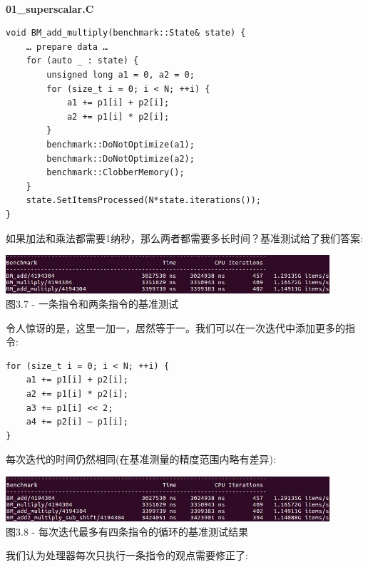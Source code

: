\hspace*{\fill} \\ %
\noindent
\textbf{01\_superscalar.C}
\begin{lstlisting}[style=styleCXX]
void BM_add_multiply(benchmark::State& state) {
	… prepare data …
	for (auto _ : state) {
		unsigned long a1 = 0, a2 = 0;
		for (size_t i = 0; i < N; ++i) {
			a1 += p1[i] + p2[i];
			a2 += p1[i] * p2[i];
		}
		benchmark::DoNotOptimize(a1);
		benchmark::DoNotOptimize(a2);
		benchmark::ClobberMemory();
	}
	state.SetItemsProcessed(N*state.iterations());
}
\end{lstlisting}

如果加法和乘法都需要1纳秒，那么两者都需要多长时间？基准测试给了我们答案:

\begin{center}
\includegraphics[width=0.9\textwidth]{content/1/chapter3/images/7.jpg}\\
图3.7 - 一条指令和两条指令的基准测试
\end{center}

令人惊讶的是，这里一加一，居然等于一。我们可以在一次迭代中添加更多的指令:

\begin{lstlisting}[style=styleCXX]
for (size_t i = 0; i < N; ++i) {
	a1 += p1[i] + p2[i];
	a2 += p1[i] * p2[i];
	a3 += p1[i] << 2;
	a4 += p2[i] – p1[i];
}
\end{lstlisting}

每次迭代的时间仍然相同(在基准测量的精度范围内略有差异):

\begin{center}
\includegraphics[width=0.9\textwidth]{content/1/chapter3/images/8.jpg}\\
图3.8 - 每次迭代最多有四条指令的循环的基准测试结果
\end{center}

我们认为处理器每次只执行一条指令的观点需要修正了:

